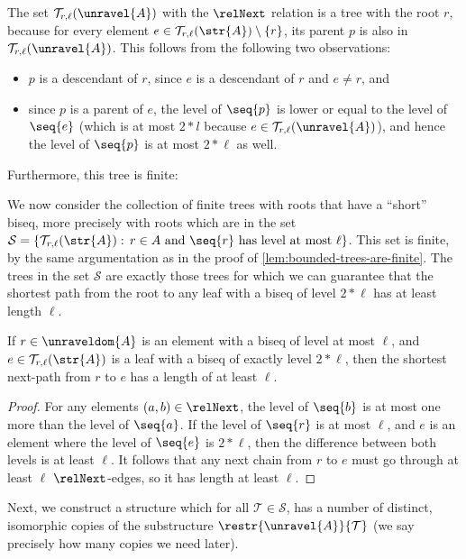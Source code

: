 \noindent
The set $\mathcal{T}_{r,\ell}(\unravel{A})$ with the $\relNext$ relation is a tree with the root $r$, because for every element $e \in \mathcal{T}_{r,\ell}(\str{A}) \setminus \{r\}$, its parent $p$ is also in $\mathcal{T}_{r,\ell}(\unravel{A})$.
This follows from the following two observations:
\begin{itemize}
  \item $p$ is a descendant of $r$, since $e$ is a descendant of $r$ and $e \neq r$, and
  \item since $p$ is a parent of $e$, the level of $\seq{p}$ is lower or equal to the level of $\seq{e}$ (which is at most $2 * l$ because $e \in \mathcal{T}_{r,\ell}(\unravel{A})$), and hence the level of $\seq{p}$ is at most $2 * \ell$ as well.
\end{itemize}
Furthermore, this tree is finite:

\noindent
We now consider the collection of finite trees with roots that have a ``short'' biseq, more precisely with roots which are in the set $\mathcal{S} = \left\{ \mathcal{T}_{r,\ell}(\str{A}):\, r \in A \text{ and } \seq{r}\ \text{has level at most $\ell$}\right\}$.
This set is finite, by the same argumentation as in the proof of \cref{lem:bounded-trees-are-finite}.
The trees in the set $\mathcal{S}$ are exactly those trees for which we can guarantee that the shortest path from the root to any leaf with a biseq of level $2 * \ell$ has at least length $\ell$.
\begin{lemma}\label{lem:bounded-trees-shortest-next-path}
  If $r \in \unraveldom{A}$ is an element with a biseq of level at most $\ell$, and $e \in \mathcal{T}_{r,\ell}(\str{A})$ is a leaf with a biseq of exactly level $2 * \ell$, then the shortest next-path from $r$ to $e$ has a length of at least $\ell$.
\end{lemma}
\begin{proof}
  For any elements $(a,b) \in \relNext$, the level of $\seq{b}$ is at most one more than the level of $\seq{a}$.
  If the level of $\seq{r}$ is at most $\ell$, and $e$ is an element where the level of $\seq{e}$ is $2 * \ell$, then the difference between both levels is at least $\ell$.
  It follows that any next chain from $r$ to $e$ must go through at least $\ell$ $\relNext$-edges, so it has length at least $\ell$.
\end{proof}
Next, we construct a structure which for all $\mathcal{T} \in \mathcal{S}$, has a number of distinct, isomorphic copies of the substructure $\restr{\unravel{A}}{\mathcal{T}}$ (we say precisely how many copies we need later).
